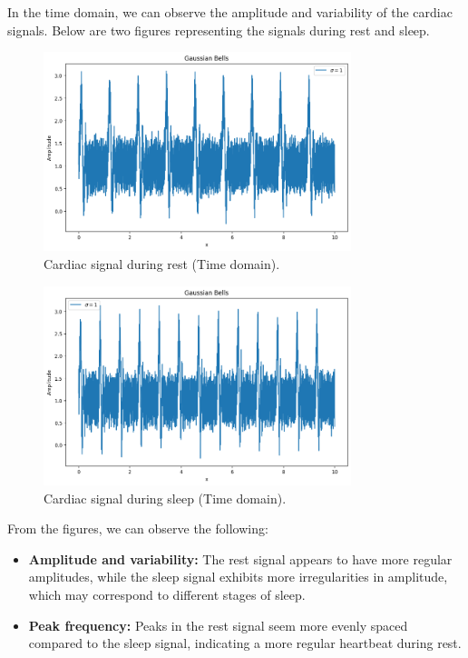 \documentclass[10pt]{article}
\theoremstyle{definition}
\theoremstyle{remark}
\theoremstyle{definition}
\numberwithin{equation}{prob}
\begin{document}
In the time domain, we can observe the amplitude and variability of the cardiac signals. Below are two figures representing the signals during rest and sleep.

\begin{figure}[H]
    \centering
    \includegraphics[width=0.8\textwidth]{./figures/Gaussian Bells Rest.png}
    \caption{Cardiac signal during rest (Time domain).}
    \label{fig:rest_signal}
\end{figure}

\begin{figure}[H]
    \centering
    \includegraphics[width=0.8\textwidth]{./figures/Gaussian Bells Sleep.png}
    \caption{Cardiac signal during sleep (Time domain).}
    \label{fig:sleep_signal}
\end{figure}

From the figures, we can observe the following:

\begin{itemize}
    \item \textbf{Amplitude and variability:} The rest signal appears to have more regular amplitudes, while the sleep signal exhibits more irregularities in amplitude, which may correspond to different stages of sleep.
    \item \textbf{Peak frequency:} Peaks in the rest signal seem more evenly spaced compared to the sleep signal, indicating a more regular heartbeat during rest.
\end{itemize}
\end{document}
